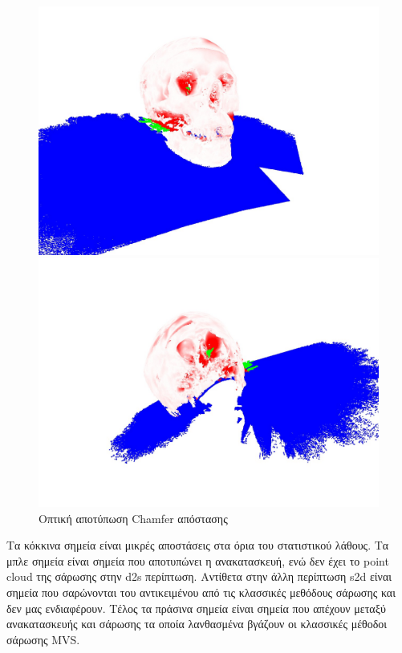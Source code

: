 \begin{figure}[H]
\begin{minipage}{0.5\linewidth}
  \end{minipage}
  \begin{minipage}{0.5\linewidth}
    \centering
    \includegraphics[width=\linewidth]{images/chapter5_img/ChamferDistViz/s2d_stylemodnffb_64_front.jpg}
  \end{minipage}%
  \begin{minipage}{0.5\linewidth}
    \centering
    \includegraphics[width=\linewidth]{images/chapter5_img/ChamferDistViz/s2d_stylemodnffb_65_back.jpg}
  \end{minipage}
  \caption{Οπτική αποτύπωση Chamfer απόστασης}
\end{figure}

Τα κόκκινα σημεία είναι μικρές αποστάσεις στα όρια του στατιστικού λάθους. Τα μπλε σημεία είναι σημεία που αποτυπώνει η ανακατασκευή, ενώ δεν έχει το point cloud της σάρωσης στην  d2s περίπτωση. Αντίθετα στην άλλη περίπτωση s2d είναι σημεία που σαρώνονται του αντικειμένου από τις  κλασσικές μεθόδους σάρωσης και δεν μας ενδιαφέρουν. Τέλος τα πράσινα σημεία είναι σημεία που απέχουν μεταξύ ανακατασκευής και σάρωσης τα οποία λανθασμένα βγάζουν οι κλασσικές μέθοδοι σάρωσης MVS.